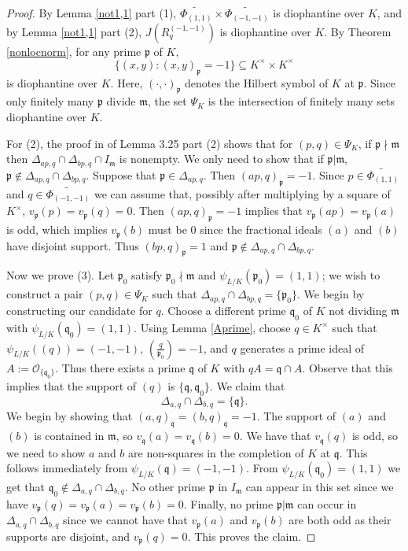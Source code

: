 \documentclass[12pt,reqno]{amsart}
\newcommand{\qq}{\mathfrak{q}}
\newcommand{\mm}{\mathfrak{m}}
\newcommand{\OO}{\mathcal{O}}
\newcommand{\pp}{\mathfrak{p}}
\theoremstyle{definition}
\begin{document}
\begin{proof}
  By Lemma \ref{not1,1} part (1),
  $\widetilde{\Phi_{(1,1)}}\times \widetilde{\Phi_{(-1,-1)}}$ is
  diophantine over $K$, and by Lemma \ref{not1,1} part (2),
  $J(R_q^{(-1,-1)})$ is diophantine over $K$. By Theorem \ref{nonlocnorm},
  for any prime $\pp$ of $K$,
\[
\{(x,y):(x,y)_{\pp}=-1\}\subseteq K^{\times}\times K^{\times}
\] 
is diophantine over $K$. Here, $(\cdot,\cdot)_{\pp}$ denotes the Hilbert symbol of $K$ at $\pp$. Since only finitely many $\pp$ divide $\mm$, the set $\Psi_K$ is the intersection of finitely many sets diophantine over $K$. 

For (2), the proof in  \cite{Park} of Lemma 3.25 part (2) shows that for $(p,q)\in \Psi_K$, if $\pp\nmid\mm$ then $\Delta_{ap,q}\cap\Delta_{bp,q}\cap I_{\mm}$ is nonempty. We only need to show that if $\pp|\mm$, $\pp\not\in \Delta_{ap,q}\cap \Delta_{bp,q}$. Suppose that $\pp\in \Delta_{ap,q}$. Then $(ap,q)_{\pp}=-1$. Since $p\in \widetilde{\Phi_{(1,1)}}$ and $q\in \widetilde{\Phi_{(-1,-1)}}$ we can assume that, possibly after multiplying by a square of $K^{\times}$, $v_{\pp}(p)=v_{\pp}(q)=0$. Then $(ap,q)_{\pp}=-1$ implies that $v_{\pp}(ap)=v_{\pp}(a)$ is odd, which implies $v_{\pp}(b)$ must be $0$ since the fractional ideals $(a)$ and $(b)$ have disjoint support. Thus $(bp,q)_{\pp}=1$ and $\pp\not\in \Delta_{ap,q}\cap\Delta_{bp,q}$. 

Now we prove (3). Let $\pp_0$ satisfy $\pp_0\nmid \mm$ and $\psi_{L/K}(\pp_0)=(1,1)$; we wish to construct a pair $(p,q)\in \Psi_K$ such that $\Delta_{ap,q}\cap\Delta_{bp,q}=\{\pp_0\}$. We begin by constructing our candidate for $q$. Choose a different prime $\qq_0$ of $K$ not dividing $\mm$ with $\psi_{L/K}(\qq_0)=(1,1)$. Using Lemma \ref{Aprime}, choose $q\in K^{\times}$ such that $\psi_{L/K}((q))=(-1,-1)$, $\left(\frac{q}{\pp_0}\right)=-1$, and $q$ generates a prime ideal of $A:=\OO_{\{\qq_0\}}$. Thus there exists a prime $\qq$ of $K$ with $qA=\qq\cap A$. Observe that this implies that the support of $(q)$ is $\{\qq,\qq_0\}$. We claim that 
\[
\Delta_{a,q}\cap\Delta_{b,q}=\{\qq\}.
\] 
We begin by showing that $(a,q)_{\qq}=(b,q)_{\qq}=-1$. The support of $(a)$ and $(b)$ is contained in $\mm$, so $v_{\qq}(a)=v_{\qq}(b)=0$. We have that $v_{\qq}(q)$ is odd, so we need to show $a$ and $b$ are non-squares in the completion of $K$ at $\qq$. This follows immediately from $\psi_{L/K}(\qq)=(-1,-1)$.  From $\psi_{L/K}(\qq_0)=(1,1)$ we get that $\qq_0\not\in \Delta_{a,q}\cap\Delta_{b,q}$. No other prime $\pp$ in $I_{\mm}$ can appear in this set since we have $v_{\pp}(q)=v_{\pp}(a)=v_{\pp}(b)=0$. Finally, no prime  $\pp|\mm$ can occur in $\Delta_{a,q}\cap\Delta_{b,q}$ since we cannot have that $v_{\pp}(a)$ and $v_{\pp}(b)$ are both odd as their supports are disjoint, and $v_{\pp}(q)=0$. This proves the claim.


\end{proof}
\end{document}
